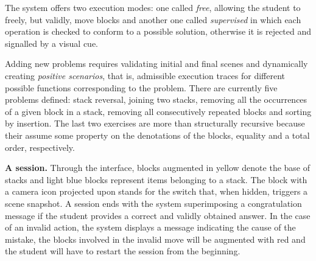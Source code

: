 The system offers two execution modes: one called \emph{free},
allowing the student to freely, but validly, move blocks and another
one called \emph{supervised} in which each operation is checked to
conform to a possible solution, otherwise it is rejected and signalled
by a visual cue.

Adding new problems requires validating initial and final scenes and
dynamically creating \emph{positive scenarios}, that is, admissible
execution traces for different possible \erlang functions
corresponding to the problem. There are currently five problems
defined: stack reversal, joining two stacks, removing all the
occurrences of a given block in a stack, removing all consecutively
repeated blocks and sorting by insertion. The last two exercises are
more than structurally recursive because their assume some property on
the denotations of the blocks, equality and a total order,
respectively.

\bigskip

\noindent\textbf{A session.} Through the interface, blocks augmented
in yellow denote the base of stacks and light blue blocks represent
items belonging to a stack. The block with a camera icon projected
upon stands for the switch that, when hidden, triggers a scene
snapshot. A session ends with the system superimposing a
congratulation message if the student provides a correct and validly
obtained answer. In the case of an invalid action, the system displays
a message indicating the cause of the mistake, the blocks involved in
the invalid move will be augmented with red and the student will have
to restart the session from the beginning.

